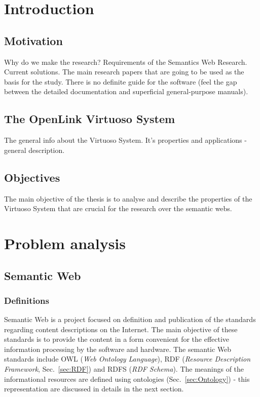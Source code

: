\chapter{Introduction}

\section{Motivation}
Why do we make the research? 
Requirements of the Semantics Web Research. 
Current solutions.
The main research papers that are going to be used as the basis for the study.
There is no definite guide for the software (feel the gap between the detailed
documentation and superficial general-purpose manuals).

\section{The OpenLink Virtuoso System}
The general info about the Virtuoso System. It's properties and applications -
general description.

\section{Objectives}
\label{sec:Objectives}
The main objective of the thesis is to analyse and describe the
properties of the Virtuoso System that are crucial for the research over the
semantic webs.

\chapter{Problem analysis}
\label{chap:Problemanalysis}

\section{Semantic Web}

\subsection{Definitions}
Semantic Web is a project focused on definition and publication of the standards
regarding content descriptions on the Internet. The main objective of these
standards is to provide the content in a form convenient for the effective
information processing by the software and hardware. The semantic Web
standards include OWL (\textit{Web Ontology Language}), RDF (\textit{Resource
Description Framework}, Sec.~\ref{sec:RDF}) and RDFS (\textit{RDF Schema}).
The meanings of the informational resources are defined using
ontologies (Sec.~\ref{sec:Ontology}) - this representation are discussed in
details in the next section.

